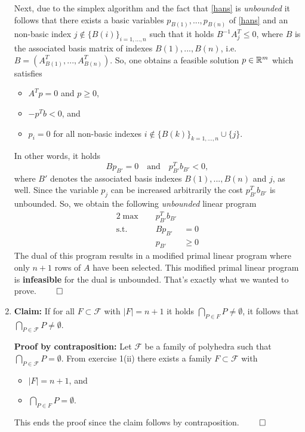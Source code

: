\documentclass[9pt]{extarticle}
\begin{document}
\begin{enumerate}[label=(\roman*)]
    Next, due to the simplex algorithm and the fact that \eqref{hans} is \emph{unbounded} it follows that there exists a basic variables $p_{B(1)},...,p_{B(n)}$ of \eqref{hans} and an non-basic index $j \notin \{B(i)\}_{i=1,...,n}$ such that it holds $B^{-1}A^T_j \leq 0$, where $B$ is the associated basis matrix of indexes $B(1),...,B(n)$, i.e. $B=(A^T_{B(1)},...,A^T_{B(n)})$. So, one obtains a feasible solution $p \in \mathbb{R}^m$ which satisfies 
    \begin{itemize}
        \item $A^Tp = 0$ and $p \geq 0$,
        \item $-p^T b < 0$, and
        \item $p_{i} = 0$ for all non-basic indexes $i \notin \{ B(k) \}_{k=1,...,n} \cup \{ j \}$.
    \end{itemize}
    In other words, it holds
    \[
        Bp_{B'} = 0 \quad \text{and} \quad p_{B'}^T b_{B'} < 0,
    \]
    where $B'$ denotes the associated basis indexes $B(1),...,B(n)$ and $j$, as well. Since the variable $p_j$ can be increased arbitrarily the cost $p_{B'}^T b_{B'}$ is unbounded. So, we obtain the following \emph{unbounded} linear program
    \begin{alignat*}{2}
        \max \quad &p_{B'}^Tb_{B'}&  \\
        \text{s.t.} \quad & Bp_{B'} &= 0 \nonumber \\
        & p_{B'} &\geq 0 \nonumber 
    \end{alignat*}
    The dual of this program results in a modified primal linear program where only $n+1$ rows of $A$ have been selected. This modified primal linear program is \textbf{infeasible} for the dual is unbounded. That's exactly what we wanted to prove. $\qed$

    \item \textbf{Claim:} If for all $F \subset \mathcal F$ with $|F|=n+1$ it holds $\bigcap_{P \in F} P \neq \emptyset$, it follows that $\bigcap_{P \in \mathcal F} P \neq \emptyset$.

    \textbf{Proof by contraposition:} Let $\mathcal F$ be a family of polyhedra such that $\bigcap_{P \in \mathcal F} P = \emptyset$. From exercise 1(ii) there exists a family $F \subset \mathcal F$ with 
    \begin{itemize}
        \item $|F|=n+1$, and
        \item $\bigcap_{P \in F} P = \emptyset$.
    \end{itemize}
    This ends the proof since the claim follows by contraposition. $\qed$
\end{enumerate}
\end{document}

